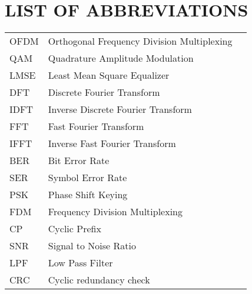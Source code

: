 \section*{LIST OF ABBREVIATIONS}
 {}

\begin{tabularx}{0.9\textwidth}{ L{0.4} L{1.3} L{1.3} }
    OFDM    & Orthogonal Frequency Division Multiplexing \\
    QAM     & Quadrature Amplitude Modulation \\
    LMSE    & Least Mean Square Equalizer \\ %
    DFT     & Discrete Fourier Transform \\
    IDFT    & Inverse Discrete Fourier Transform \\
    FFT     & Fast Fourier Transform \\
    IFFT    & Inverse Fast Fourier Transform \\
    BER     & Bit Error Rate \\
    SER     & Symbol Error Rate \\
    PSK     & Phase Shift Keying \\
    FDM     & Frequency Division Multiplexing \\
    CP      & Cyclic Prefix \\
    SNR     & Signal to Noise Ratio \\
    LPF     & Low Pass Filter \\
    CRC     & Cyclic redundancy check \\
\end{tabularx}

\newpage